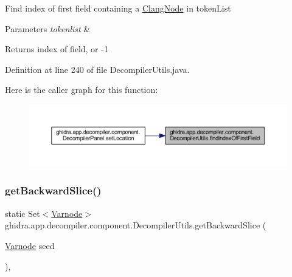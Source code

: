 Find index of first field containing a \mbox{\hyperlink{interfaceghidra_1_1app_1_1decompiler_1_1_clang_node}{Clang\+Node}} in token\+List 
\begin{DoxyParams}{Parameters}
{\em tokenlist} & \\
\hline
\end{DoxyParams}
\begin{DoxyReturn}{Returns}
index of field, or -\/1 
\end{DoxyReturn}


Definition at line 240 of file Decompiler\+Utils.\+java.

Here is the caller graph for this function\+:
\nopagebreak
\begin{figure}[H]
\begin{center}
\leavevmode
\includegraphics[width=350pt]{classghidra_1_1app_1_1decompiler_1_1component_1_1_decompiler_utils_ae6bf8e2f218a0398cb90ce2826f16904_icgraph}
\end{center}
\end{figure}
\mbox{\label{classghidra_1_1app_1_1decompiler_1_1component_1_1_decompiler_utils_a1307674bdd9f48bfb0919950d59be19b}} 
\subsubsection{\texorpdfstring{getBackwardSlice()}{getBackwardSlice()}}
{\footnotesize\ttfamily static Set$<$\mbox{\hyperlink{class_varnode}{Varnode}}$>$ ghidra.\+app.\+decompiler.\+component.\+Decompiler\+Utils.\+get\+Backward\+Slice (\begin{DoxyParamCaption}\item[{\mbox{\hyperlink{class_varnode}{Varnode}}}]{seed }\end{DoxyParamCaption})\hspace{0.3cm}{\ttfamily [inline]}, {\ttfamily [static]}}



